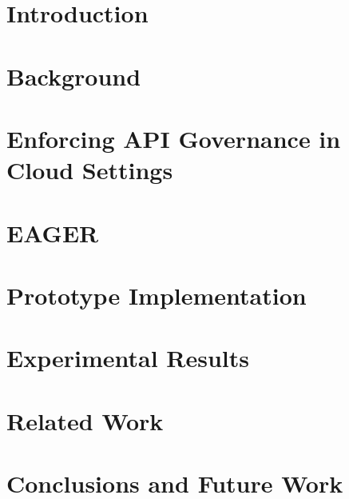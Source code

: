 \section{Introduction}
\label{sec:eager_intro}


\section{Background}
\label{sec:eager_bg}


\section{Enforcing API Governance in Cloud Settings}
\label{sec:eager_enforce}


\section{EAGER}
\label{sec:eager_eager}


\section{Prototype Implementation}
\label{sec:eager_prototype_impl}


\section{Experimental Results}
\label{sec:eager_results}


\section{Related Work}
\label{sec:eager_related_work}


\section{Conclusions and Future Work}
\label{sec:eager_conc}

